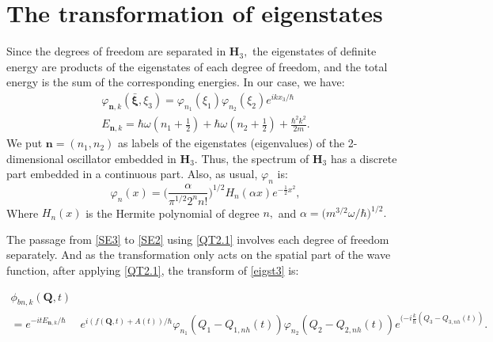 \documentclass[12pt]{article}
\numberwithin{equation}{section}
\newcommand{\bxi}{{\boldsymbol \xi}}
\def\bQ{{\boldsymbol Q}}
\def\bH{{\boldsymbol H}}
\def\bn{{\boldsymbol n}}
\begin{document}
\section{The transformation of eigenstates}
Since the degrees of freedom are separated in $\bH_3,$ the eigenstates of definite energy are products of the eigenstates of each degree of freedom, and the total energy is the sum of the corresponding energies. In our case, we have:
\begin{gather}
 \varphi_{\bn,k}(\bar{\bxi},\xi_3) = \varphi_{n_1}(\xi_1)\varphi_{n_2}(\xi_2)e^{ikx_3/\hbar}\label{eigst3}\\
E_{\bn,k} = \hbar\omega(n_1+\frac{1}{2}) +  \hbar\omega(n_2+\frac{1}{2}) +\frac{\hbar^2k^2}{2m}. \label{eigvl3}
\end{gather}
We put $\bn=(n_1,n_2)$ as labels of the eigenstates (eigenvalues) of the 2-dimensional oscillator embedded in $\bH_3.$ Thus, the spectrum of $\bH_3$ has a discrete part embedded in a continuous part. Also, as usual, $\varphi_n$ is:
\begin{equation}\label{evec1}
\varphi_n(x) = \bigg(\frac{\alpha}{\pi^{1/2}2^nn!}\bigg)^{1/2}H_n(\alpha x)e^{-\frac{1}{2}x^2},
\end{equation}
Where $H_n(x)$ is the Hermite polynomial of degree $n,$ and $\alpha=\big(m^{3/2}\omega/\hbar\big)^{1/2}.$

The passage from \eqref{SE3} to \eqref{SE2} using \eqref{QT2.1}  involves each degree of freedom separately. And as the transformation only acts on the spatial part of the wave function, after applying \eqref{QT2.1}, the transform of \eqref{eigst3} is:

\begin{equation}\label{eigst2}
\begin{aligned}
\phi_{bn,k}(\bQ,t) &\\
=  e^{-itE_{\bn,k}/\hbar}&e^{i(f(\bQ,t) + A(t))/\hbar}\varphi_{n_1}(Q_1-Q_{1,nh}(t))\varphi_{n_2}(Q_2-Q_{2,nh}(t))e^{(-i\frac{k}{\hbar}(Q_3-Q_{3,nh}(t))}.
\end{aligned}
\end{equation}
\end{document}
